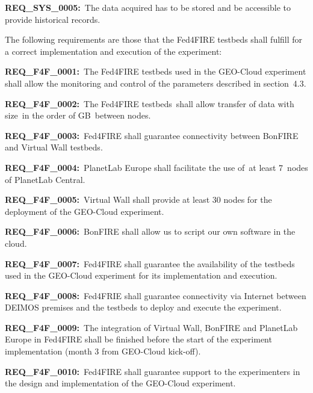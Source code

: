 \documentclass[a4paper]{article}
\begin{document}
\bigskip

\textbf{REQ\_SYS\_0005:}\ The data acquired has to be stored and be
accessible to provide historical records.


\bigskip

The following requirements are those that the Fed4FIRE testbeds shall
fulfill for a correct implementation and execution of the experiment:


\bigskip

\textbf{REQ\_F4F\_0001:}\ The Fed4FIRE testbeds used in the GEO-Cloud
experiment shall allow the monitoring and control of the parameters
described in section\ 4.3.


\bigskip

\textbf{REQ\_F4F\_0002:}\ The Fed4FIRE testbeds\ shall allow transfer of
data with size\ in the order of GB\ between nodes.


\bigskip

\textbf{REQ\_F4F\_0003:}\ Fed4FIRE shall guarantee connectivity between
BonFIRE and Virtual Wall testbeds.


\bigskip

\textbf{REQ\_F4F\_00}\textbf{0}\textbf{4:}\ PlanetLab Europe shall
facilitate the use of\ at least 7\ nodes of PlanetLab Central.


\bigskip

\textbf{REQ\_F4F\_0005:}\ Virtual Wall shall provide at least 30 nodes
for the deployment of the GEO-Cloud experiment.


\bigskip

\textbf{REQ\_F4F\_00}\textbf{0}\textbf{6:}\ BonFIRE shall allow us to
script our own software in the cloud.


\bigskip

\textbf{REQ\_F4F\_0007:}\ Fed4FIRE shall guarantee the availability of
the testbeds used in the GEO-Cloud experiment for its implementation
and execution.


\bigskip

\textbf{REQ\_F4F\_0008:}\ Fed4FRIE shall guarantee connectivity via
Internet between DEIMOS premises and the testbeds to deploy and execute
the experiment.\ 


\bigskip

\textbf{REQ\_F4F\_0009:}\ The integration of Virtual Wall, BonFIRE and
PlanetLab Europe in Fed4FIRE shall be finished before the start of the
experiment implementation (month 3 from GEO-Cloud kick-off).


\bigskip

\textbf{REQ\_F4F\_0010:}\ Fed4FIRE shall guarantee support to the
experimenters in the design and implementation of the GEO-Cloud
experiment.
\end{document}
